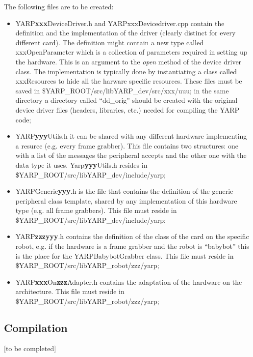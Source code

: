 The following files are to be created:
\begin{itemize}

\item YARP{\bf xxx}DeviceDriver.h and YARPxxxDevicedriver.cpp contain the definition and the implementation of the driver (clearly distinct for every different card). The definition might contain a new type called xxxOpenParameter which is a collection of parameters required in setting up the hardware. This is an argument to the {\em open} method of the device driver class. The implementation is typically done by instantiating a class called xxxResources to hide all the harware specific resources. These files must be saved in \$YARP\_ROOT/src/libYARP\_dev/src/xxx/uuu; in the same directory a directory called ``dd\_orig'' should be created with the original device driver files (headers, libraries, etc.) needed for compiling the YARP code;

\item YARP{\bf yyy}Utils.h it can be shared with any different hardware implementing a resurce (e.g. every frame grabber). This file contains two structures: one with a list of the messages the peripheral accepts and the other one with the data type it uses. Yarp{\bf yyy}Utils.h resides in \$YARP\_ROOT/src/libYARP\_dev/include/yarp;

\item YARPGeneric{\bf yyy}.h is the file that contains the definition of the generic peripheral class template, shared by any implementation of this hardware type (e.g. all frame grabbers). This file must reside in \$YARP\_ROOT/src/libYARP\_dev/include/yarp;


\item YARP{\bf zzzyyy}.h contains the definition of the class of the card on the specific robot, e.g. if the hardware is a frame grabber and the robot is ``babybot'' this is the place for the YARPBabybotGrabber class. This file must reside in \$YARP\_ROOT/src/libYARP\_robot/zzz/yarp;

\item YARP{\bf xxx}On{\bf zzz}Adapter.h contains the adaptation of the hardware on the architecture. This file must reside in \$YARP\_ROOT/src/libYARP\_robot/zzz/yarp;

\end{itemize}


\subsection{Compilation}
[to be completed]



